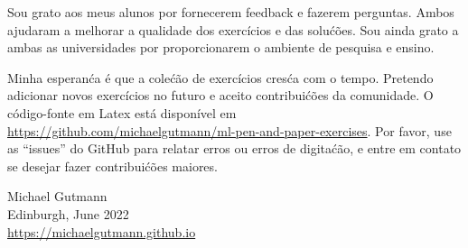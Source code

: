 \hspace{2ex} Sou grato aos meus alunos por fornecerem feedback e fazerem perguntas. Ambos ajudaram a melhorar a qualidade dos exerc\'icios e das solu\'c\~oes. Sou ainda grato a ambas as universidades por proporcionarem o ambiente de pesquisa e ensino.

\hspace{2ex} Minha esperan\'ca \'e que a cole\'c\~ao de exerc\'icios cres\'ca com o tempo. Pretendo adicionar novos exerc\'icios no futuro e aceito contribui\'c\~oes da comunidade. O c\'odigo-fonte em Latex est\'a dispon\'ivel em \url{https://github.com/michaelgutmann/ml-pen-and-paper-exercises}. Por favor, use as ``issues'' do GitHub para relatar erros ou erros de digita\'c\~ao, e entre em contato se desejar fazer contribui\'c\~oes maiores.

\begin{flushright}
  Michael Gutmann\\
  Edinburgh, June 2022\\
  \url{https://michaelgutmann.github.io}
\end{flushright}


